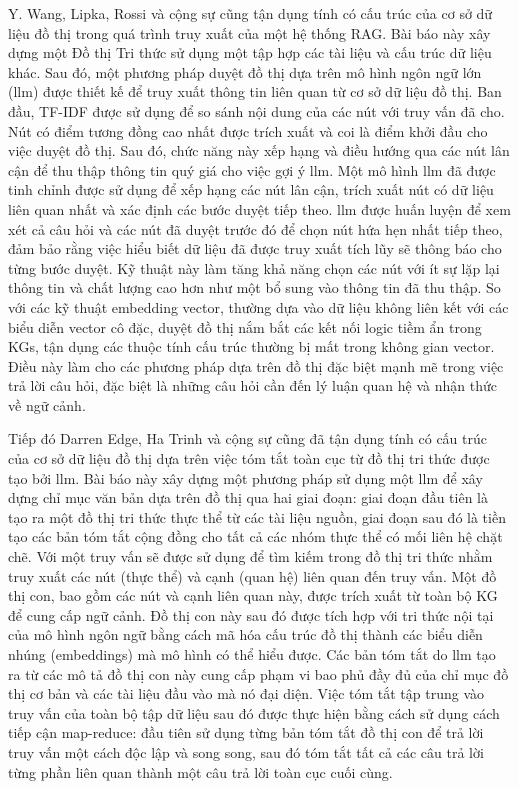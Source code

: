 Y. Wang, Lipka, Rossi và cộng sự \cite{wang2024knowledge} cũng tận dụng tính có cấu trúc của cơ sở dữ liệu đồ thị trong quá trình truy xuất của một hệ thống RAG. Bài báo này xây dựng một Đồ thị Tri thức sử dụng một tập hợp các tài liệu và cấu trúc dữ liệu khác. Sau đó, một phương pháp duyệt đồ thị dựa trên mô hình ngôn ngữ lớn (\gls{llm}) được thiết kế để truy xuất thông tin liên quan từ cơ sở dữ liệu đồ thị. Ban đầu, TF-IDF được sử dụng để so sánh nội dung của các nút với truy vấn đã cho. Nút có điểm tương đồng cao nhất được trích xuất và coi là điểm khởi đầu cho việc duyệt đồ thị. Sau đó, chức năng này xếp hạng và điều hướng qua các nút lân cận để thu thập thông tin quý giá cho việc gợi ý \gls{llm}. Một mô hình \gls{llm} đã được tinh chỉnh được sử dụng để xếp hạng các nút lân cận, trích xuất nút có dữ liệu liên quan nhất và xác định các bước duyệt tiếp theo. \gls{llm} được huấn luyện để xem xét cả câu hỏi và các nút đã duyệt trước đó để chọn nút hứa hẹn nhất tiếp theo, đảm bảo rằng việc hiểu biết dữ liệu đã được truy xuất tích lũy sẽ thông báo cho từng bước duyệt. Kỹ thuật này làm tăng khả năng chọn các nút với ít sự lặp lại thông tin và chất lượng cao hơn như một bổ sung vào thông tin đã thu thập. So với các kỹ thuật embedding vector, thường dựa vào dữ liệu không liên kết với các biểu diễn vector cô đặc, duyệt đồ thị nắm bắt các kết nối logic tiềm ẩn trong KGs, tận dụng các thuộc tính cấu trúc thường bị mất trong không gian vector. Điều này làm cho các phương pháp dựa trên đồ thị đặc biệt mạnh mẽ trong việc trả lời câu hỏi, đặc biệt là những câu hỏi cần đến lý luận quan hệ và nhận thức về ngữ cảnh.

Tiếp đó Darren Edge, Ha Trinh và cộng sự \cite{microsoftGraphRAG} cũng đã tận dụng tính có cấu trúc của cơ sở dữ liệu đồ thị dựa trên việc tóm tắt toàn cục từ đồ thị tri thức được tạo bởi \gls{llm}. Bài báo này xây dựng một phương pháp sử dụng một \gls{llm} để xây dựng chỉ mục văn bản dựa trên đồ thị qua hai giai đoạn: giai đoạn đầu tiên là tạo ra một đồ thị tri thức thực thể từ các tài liệu nguồn, giai đoạn sau đó là tiền tạo các bản tóm tắt cộng đồng cho tất cả các nhóm thực thể có mối liên hệ chặt chẽ. Với một truy vấn sẽ được sử dụng để tìm kiếm trong đồ thị tri thức nhằm truy xuất các nút (thực thể) và cạnh (quan hệ) liên quan đến truy vấn. Một đồ thị con, bao gồm các nút và cạnh liên quan này, được trích xuất từ toàn bộ KG để cung cấp ngữ cảnh. Đồ thị con này sau đó được tích hợp với tri thức nội tại của mô hình ngôn ngữ bằng cách mã hóa cấu trúc đồ thị thành các biểu diễn nhúng (embeddings) mà mô hình có thể hiểu được. Các bản tóm tắt do \gls{llm} tạo ra từ các mô tả đồ thị con này cung cấp phạm vi bao phủ đầy đủ của chỉ mục đồ thị cơ bản và các tài liệu đầu vào mà nó đại diện. Việc tóm tắt tập trung vào truy vấn của toàn bộ tập dữ liệu sau đó được thực hiện bằng cách sử dụng cách tiếp cận map-reduce: đầu tiên sử dụng từng bản tóm tắt đồ thị con để trả lời truy vấn một cách độc lập và song song, sau đó tóm tắt tất cả các câu trả lời từng phần liên quan thành một câu trả lời toàn cục cuối cùng.

